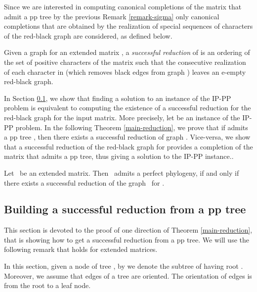 \documentclass{llncs}
\newcommand{\grb}{ }
\newcommand{\me}{{} }
\newcommand{\mec}{{}, }
\newcommand{\med}{{}. }
\begin{document}
Since
 we are interested in computing  canonical completions of the matrix that admit a pp tree   by  the previous Remark \ref{remark-sigma} only canonical completions that are obtained by the realization of  special   sequences of characters of the red-black graph are considered, as defined below.

\begin{definition}

\label{suc-red}
 Given a graph \grb for an extended matrix \mec  a {\em successful  reduction} of \grb is an ordering   of  the set of positive  characters  of the matrix such that the 
consecutive realization of each character in  (which removes
 black edges from graph )   leaves an   e-empty red-black graph.

\end{definition}

In   Section \ref{prova}, we show that finding a solution to an instance  of the IP-PP problem   is equivalent to computing the existence of a successful reduction for the red-black graph for the input matrix.
More precisely, let  be an instance of the IP-PP problem.  In the following Theorem   \ref{main-reduction},  we prove  that if   \me admits a pp tree , then there exists a successful reduction of graph .
Vice-versa,  we show that  a successful reduction of  the red-black graph for   provides a completion  of the matrix \me that admits a pp tree, thus giving   a  solution to the IP-PP instance..  



\begin{theorem} \label{main-reduction}   Let \me\ be an extended matrix.
Then  \me\ admits a   perfect phylogeny,  if and only if
 there exists a successful reduction of the graph \grb \ for \med

\end{theorem}

\subsection{Building   a successful reduction from a pp tree}

\label{prova}

This section is devoted to the  proof of  one direction of  Theorem  \ref{main-reduction}, that is showing  how to get a successful reduction from a pp tree.    We  will use the following remark that holds for extended matrices.




In this section, given a node  of tree , by  we denote the subtree of  having root . Moreover, we assume that edges of a tree  are oriented. The orientation of edges is  from the root to a leaf node. 
\end{document}
